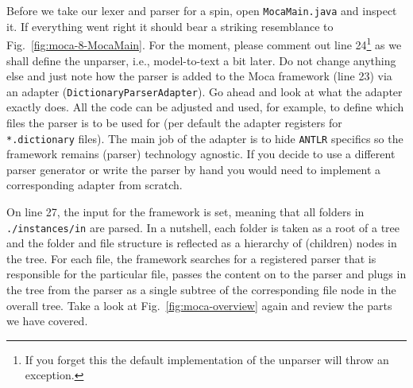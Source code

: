 Before we take our lexer and parser for a spin, open \texttt{MocaMain.java} and inspect it.
If everything went right it should bear a striking resemblance to Fig.~\ref{fig:moca-8-MocaMain}.
For the moment, please comment out line 24\footnote{If you forget this the default implementation of the unparser will throw an exception.} as we shall define the unparser, i.e., model-to-text a bit later.
Do not change anything else and just note how the parser is added to the Moca framework (line 23) via an adapter (\texttt{Dictionary\-Parser\-Adapter}).
Go ahead and look at what the adapter exactly does.
All the code can be adjusted and used, for example, to define which files the parser is to be used for (per default the adapter registers for \texttt{*.dictionary} files).
The main job of the adapter is to hide \texttt{ANTLR} specifics so the framework remains (parser) technology agnostic.
If you decide to use a different parser generator or write the parser by hand you would need to implement a corresponding adapter from scratch.

On line 27, the input for the framework is set, meaning that all folders in \texttt{./instances/in} are parsed.
In a nutshell, each folder is taken as a root of a tree and the folder and file structure is reflected as a hierarchy of (children) nodes in the tree.
For each file, the framework searches for a registered parser that is responsible for the particular file, passes the content on to the parser and plugs in the tree from the parser as a single subtree of the corresponding file node in the overall tree.  Take a look at Fig.~\ref{fig:moca-overview} again and review the parts we have covered.

